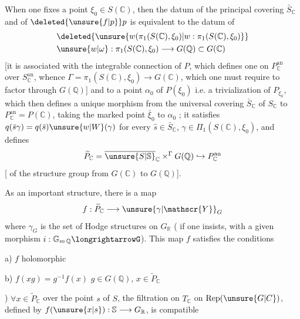 When one fixes a point $\xi_0\in S(\mathbb{C})$,\deleted{\unsure{$\xi$|,}} then the datum of the principal covering $\bar S_{\mathbb{C}}$ and of $\deleted{\unsure{f|p}}p$ is equivalent to the datum of
\[
\begin{aligned}
&\deleted{\unsure{w(\pi_1(S(\mathbb{C}),\xi_0)|w:\pi_1(S(\mathbb{C}),\xi_0)}}\\
&\unsure{w|\omega}:\pi_1(S(\mathbb{C}),\xi_0)\longrightarrow G(\mathbb{Q})\subset G(\mathbb{C})
\end{aligned}
\]
[it is associated with the integrable connection of $P$, which defines one on $P_{\mathbb{C}}^{\mathrm{an}}$ over $S_{\mathbb{C}}^{\mathrm{an}}$, whence $\Gamma=\pi_1(S(\mathbb{C}),\xi_0)\longrightarrow G(\mathbb{C})$, which one must require to factor through $G(\mathbb{Q})$] and to a  point $\alpha_0$ of $P(\xi_0)$ i.e. a trivialization of $P_{\xi_0}$, which then defines a unique morphism  from the universal covering $\bar S_{\mathbb{C}}$ of $S_{\mathbb{C}}$ to $P_{\mathbb{C}}^{\mathrm{an}}=P(\mathbb{C})$, taking the marked point $\bar\xi_0$ to $\alpha_0$ ; it satisfies  $q(\bar s\gamma)=q(\bar s)\unsure{w|W}(\gamma)$ for every $\hat s\in\bar S_{\mathbb{C}}$,  $\gamma\in\Pi_1(S(\mathbb{C}),\xi_0)$,  and defines
\[
\widetilde P_{\mathbb{C}}=\overline{\unsure{S|\mathbb{S}}}_{\mathbb{C}}\mathbin{\times}^{\Gamma}G(\mathbb{Q})\hookrightarrow P_{\mathbb{C}}^{\mathrm{an}}
\]
[ of the structure group  from $G(\mathbb{C})$ to $G(\mathbb{Q})$].

As an important structure, there is a map
\[
f:\widetilde P_{\mathbb{C}}\longrightarrow\unsure{\gamma|\mathscr{Y}}_G
\]
where $\gamma_G$ is the set of Hodge structures on $G_{\mathbb{R}}$ ( if one insists, with a given morphism $i:\mathbb{G}_{m\,\mathbb{Q}}\longrightarrowG$). This map $f$ satisfies the conditions

a) $f$ holomorphic

b) $f(xg)=g^{-1}f(x)$ \qquad $g\in G(\mathbb{Q}),\,x\in\widetilde P_{\mathbb{C}}$

) $\forall x\in\widetilde P_{\mathbb{C}}$ over the point $s$ of $S$, the filtration  on $T_{\mathbb{C}}$ on $\operatorname{Rep}(\unsure{G|C})$, defined by $f(\unsure{x|s}):\mathbb{S}\longrightarrow G_{\mathbb{R}}$, is compatible
